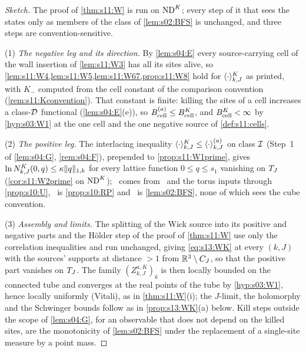 \begin{proof}[Sketch]
The proof of \cref{thm:s11:W} is run on $\mathrm{ND}^{K}$; every step of it that sees the states only as members of the class of \cref{lem:s02:BFS} is unchanged, and three steps are convention-sensitive.

(1) \emph{The negative leg and its direction.} By \cref{lem:s04:E} every source-carrying cell of the wall insertion of \cref{lem:s11:W3} has all its sites alive, so \cref{lem:s11:W4,lem:s11:W5,lem:s11:W67,prop:s11:W8} hold for $\langle \cdot\rangle^{K}_{k,J}$ as printed, with $K_-$ computed from the cell constant of the comparison convention (\cref{rem:s11:Kconvention}). That constant is finite: killing the sites of a cell increases a class-$\mathcal D$ functional (\cref{lem:s04:E}(e)), so $B^{(a)}_{\rm cell}\le B^K_{\rm cell}$, and $B^K_{\rm cell}<\infty$ by \cref{hyp:s03:W1} at the one cell and the one negative source of \cref{def:s11:cells}.

(2) \emph{The positive leg.} The interlacing inequality $\langle \cdot\rangle^{K}_{k,J}\le\langle \cdot\rangle^{(a)}_{k,J}$ on class $\mathcal I$ (Step~1 of \cref{lem:s04:G}, \cref{rem:s04:F}), prepended to \cref{prop:s11:W1prime}, gives $\ln N^K_{k,J}(0,q)\le\kappa\lVert q\rVert_{1,k}$ for every lattice function $0\le q\le s_1$ vanishing on $T_J$ (\cref{cor:s11:W2prime} on $\mathrm{ND}^{K}$); \Itwo\ comes from \Tthree\ and the torus inputs through \cref{prop:s10:U}, \Ithree\ is \cref{prop:s10:RP} and \Ifour\ is \cref{lem:s02:BFS}, none of which sees the cube convention.

(3) \emph{Assembly and limits.} The splitting of the Wick source into its positive and negative parts and the H\"older step of the proof of \cref{thm:s11:W} use only the correlation inequalities and run unchanged, giving \eqref{eq:s13:WK} at every $(k,J)$ with the sources' supports at distance $>1$ from $\mathbb R^3\setminus C_J$, so that the positive part vanishes on $T_J$. The family $(Z^{a,K}_{k,J})_k$ is then locally bounded on the connected tube and converges at the real points of the tube by \cref{hyp:s03:W1}, hence locally uniformly (Vitali), as in \cref{thm:s11:W}(i); the $J$-limit, the holomorphy and the Schwinger bounds follow as in \cref{prop:s13:WK}(a) below. Kill steps outside the scope of \cref{lem:s04:G}, for an observable that does not depend on the killed sites, are the monotonicity of \cref{lem:s02:BFS} under the replacement of a single-site measure by a point mass.
\end{proof}

